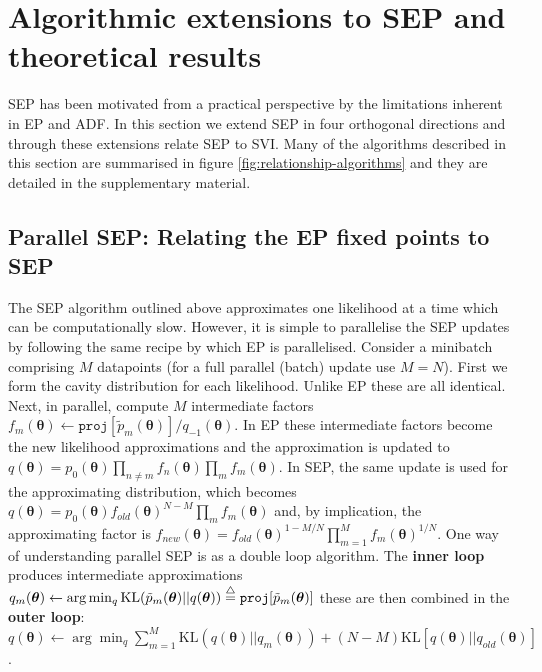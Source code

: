 \section{Algorithmic extensions to SEP and theoretical results}
%
SEP has been motivated from a practical perspective by the limitations inherent in EP and ADF. In this section we extend SEP in four orthogonal directions and through these extensions relate SEP to SVI. Many of the algorithms described in this section are summarised in figure \ref{fig:relationship-algorithms} and they are detailed in the supplementary material.


%
\subsection{Parallel SEP: Relating the EP fixed points to SEP}
%

The SEP algorithm outlined above approximates one likelihood at a time which can be computationally slow. However, it is simple to parallelise the SEP updates by following the same recipe by which EP is parallelised. Consider a minibatch comprising $M$ datapoints (for a full parallel (batch) update use $M=N$). First we form the cavity distribution for each likelihood. Unlike EP these are all identical. Next, in parallel, compute $M$ intermediate factors $f_m(\bm{\theta}) \leftarrow \mathtt{proj}[\tilde{p}_m(\bm{\theta})] / q_{-1}(\bm{\theta})$. In EP these intermediate factors become the new likelihood approximations and the approximation is updated to $q(\bm{\theta}) = p_0(\bm{\theta}) \prod_{n \ne m} f_n(\bm{\theta}) \prod_{m} f_m(\bm{\theta}) $. In SEP, the same update is used for the approximating distribution, which becomes $q(\bm{\theta}) = p_0(\bm{\theta}) f_{old}(\bm{\theta})^{N-M} \prod_{m} f_m(\bm{\theta}) $ and, by implication, the approximating factor is $f_{new}(\bm{\theta}) = f_{old}(\bm{\theta})^{1-M/N} \prod_{m=1}^M f_m(\bm{\theta})^{1/N}$. One way of understanding parallel SEP is as a double loop algorithm. The \textbf{inner loop} produces intermediate approximations  $q_m(\bm{\theta}) \leftarrow \arg\min_q \mathrm{KL}(\tilde{p}_m(\bm{\theta}) ||q(\bm{\theta})) \buildrel\triangle\over = \mathtt{proj}[\tilde{p}_m(\bm{\theta})]$ these are then combined in the \textbf{outer loop}: $q(\bm{\theta}) \leftarrow \arg\min_q \sum_{m=1}^M \mathrm{KL}(q(\bm{\theta}) ||q_m(\bm{\theta})) + (N-M) \mathrm{KL}[q(\bm{\theta}) || q_{old}(\bm{\theta})]$.

